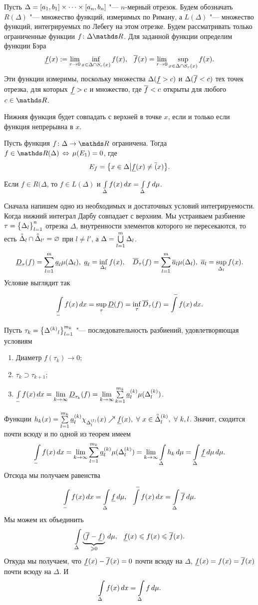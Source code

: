   Пусть $\Delta = [a_1,b_1]\tds[a_n,b_n]$ "--- $n$-мерный отрезок. Будем обозначать $R(\Delta)$ "--- множество функций, измеримых по Риману, а $L(\Delta)$ "--- множество функций, интегрируемых по Лебегу на этом отрезке. Будем рассматривать только ограниченные функции $f\colon \Delta\R$. Для заданной функции определим функции Бэра
\[
  \ul f(x): = \yo r0\inf\limits_{x\in\Delta\cap S_r(x)}f(x),\pau \ol f(x) = \yo r0\sup\limits_{x\in\Delta\cap S_r(x)}f(x).
\]
Эти функции измеримы, поскольку множества $\Delta(\ul f>c)$ и $\Delta(\ol f<c)$ тех точек отрезка, для которых $\ul f>c$ и множество, где $\ol f<c$ открыты для любого $c\in \R$.


Нижняя функция будет совпадать с верхней в точке $x$, если и только если функция непрерывна в $x$.
\begin{The}
  Пусть функция $f\colon \Delta\to \R$ ограничена. Тогда $f\in\R(\Delta)\iff \mu(E_1) =0$, где 
\[
  E_f = \big\{x\in\Delta\big| \ul f(x)\ne\ol(x)\big\}.
\]

 Если $f\in R(\Delta$, то $f\in L(\Delta)$ и $\I[x]\Delta {f(x)} = \I\Delta f$.
\end{The}

\begin{Proof}
  Сначала напишем одно из необходимых и достаточных условий интегрируемости. Когда нижний интеграл Дарбу совпадает с верхним. Мы устраиваем разбиение $\tau = \ar\Delta l1n$ отрезка $\Delta$, внутренности элементов которого не пересекаются, то есть $\overcirc\Delta_l\cap\overcirc\Delta_{l'}=\q$ при $l\ne l'$, а $\Delta = \UN l1m\Delta_l$.
\[
  \ul D_\tau(f) = \RY l1m \ul a_l\mu(\Delta_l),\ \ul a_l = \inf\limits_{\Delta_l}f(x),\quad
  \ol D_\tau(f) = \RY l1m \ol a_l\mu(\Delta_l),\ \ol a_l = \sup\limits_{\Delta_l}f(x).
\]
Условие выглядит так
\[
  \I[x]-{f(x)} = \sup\limits_\tau \ul D(f) = \inf\limits_\tau \ol D_\tau(f) = \int\limits^- f(x)\,dx.
\]

Пусть $\tau_k = \ar {\Delta^{(k)}}l1{m_k}$ "--- последовательность разбиений, удовлетворяющая условиям
\begin{enumerate}
  \item Диаметр $f(\tau_k)\to 0$;
  \item $\tau_k\supset \tau_{k+1}$;
  \item $\I[x]-{f(x)} = \yo k\infty \ul D_{\tau_k}(f) = \yo k\infty\RY k1{m_k}\ul a_l^{(k)} \mu(\Delta_l^{(k)})$.
\end{enumerate}

Функции $h_k(x)=\RY l1{m_k}\ul a_l^{(k)}\chi_{\Delta_l^{(l)}}(x)\nearrow \ul f(x),\ \forall\ x\in \overcirc\Delta_l^{(k)},\ \forall\ k,l$. Значит, сходится почти всюду и по одной из теорем имеем
\[
  \I[x]-{f(x)} = \yo k\infty\RY l1{m_k}\ul a_l^{(k)}\mu(\Delta_l^{(k)}) = \yo k\infty\I\Delta {h_k} = \I\Delta{\ul f}\,d\mu.
\]
Отсюда мы получаем равенства
\[
  \I[x]-{f(x)} = \I\Delta{\ul f},\pau \int\limits^-f(x)\,dx = \I\Delta{\ol f}.
\]
Мы можем их объединить
\[
  \I\Delta{\underbrace{(\ol f-\ul f)}_{\ge0}},\pau \ul f(x)\le f(x)\le \ol f(x).
\]
Откуда мы получаем, что $\ul f(x)-\ol f(x) = 0$ почти всюду на $\Delta$, $\ul f(x) = f(x) = \ol f(x)$ почти всюду на $\Delta$. И
\[
  \I[x]\Delta {f(x)} = \I\Delta f.
\]
\end{Proof}

